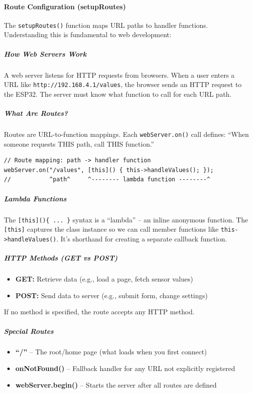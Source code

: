 \paragraph{Route Configuration (setupRoutes)}
The \texttt{setupRoutes()} function maps URL paths to handler functions. Understanding this is fundamental to web development:

\subparagraph{How Web Servers Work}
A web server listens for HTTP requests from browsers. When a user enters a URL like \texttt{http://192.168.4.1/values}, the browser sends an HTTP request to the ESP32. The server must know what function to call for each URL path.

\subparagraph{What Are Routes?}
Routes are URL-to-function mappings. Each \texttt{webServer.on()} call defines: ``When someone requests THIS path, call THIS function.''

\begin{lstlisting}[caption=Route Registration Example]
// Route mapping: path -> handler function
webServer.on("/values", [this]() { this->handleValues(); });
//           ^path^     ^-------- lambda function --------^
\end{lstlisting}

\subparagraph{Lambda Functions}
The \texttt{[this]()\{ ... \}} syntax is a ``lambda'' -- an inline anonymous function. The \texttt{[this]} captures the class instance so we can call member functions like \texttt{this->handleValues()}. It's shorthand for creating a separate callback function.

\subparagraph{HTTP Methods (GET vs POST)}
\begin{itemize}
    \item \textbf{GET:} Retrieve data (e.g., load a page, fetch sensor values)
    \item \textbf{POST:} Send data to server (e.g., submit form, change settings)
\end{itemize}
If no method is specified, the route accepts any HTTP method.

\subparagraph{Special Routes}
\begin{itemize}
    \item \textbf{``/''} -- The root/home page (what loads when you first connect)
    \item \textbf{onNotFound()} -- Fallback handler for any URL not explicitly registered
    \item \textbf{webServer.begin()} -- Starts the server after all routes are defined
\end{itemize}

